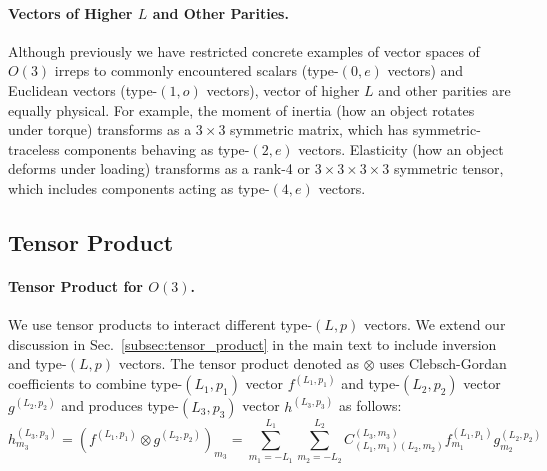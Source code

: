 \paragraph{Vectors of Higher $L$ and Other Parities.}
Although previously we have restricted concrete examples of vector spaces of $O(3)$ irreps to commonly encountered scalars (type-$(0, e)$ vectors) and Euclidean vectors (type-$(1, o)$ vectors), vector of higher $L$ and other parities are equally physical. 
For example, the moment of inertia (how an object rotates under torque) transforms as a $3\times3$ symmetric matrix, which has symmetric-traceless components behaving as type-$(2, e)$ vectors.
Elasticity (how an object deforms under loading) transforms as a rank-4 or $3\times3\times3\times3$ symmetric tensor, which includes components acting as type-$(4, e)$ vectors.


\subsection{Tensor Product}
\label{appendix:subsec:tensor_product}

\paragraph{Tensor Product for $O(3)$.}
We use tensor products to interact different type-$(L, p)$ vectors.
We extend our discussion in Sec.~\ref{subsec:tensor_product} in the main text to include inversion and type-$(L, p)$ vectors.
The tensor product denoted as $\otimes$ uses Clebsch-Gordan coefficients to combine type-$(L_1, p_1)$ vector $f^{(L_1, p_1)}$ and type-$(L_2, p_2)$ vector $g^{(L_2, p_2)}$ and produces type-$(L_3, p_3)$ vector $h^{(L_3, p_3)}$ as follows:
\begin{equation}
h^{(L_3, p_3)}_{m_3} = (f^{(L_1, p_1)} \otimes g^{(L_2, p_2)})_{m_3} = \sum_{m_1 = -L_1}^{L_1} \sum_{m_2 = -L_2}^{L_2} C^{(L_3, m_3)}_{(L_1, m_1)(L_2, m_2)} f^{(L_1, p_1)}_{m_1} g^{(L_2, p_2)}_{m_2} 
\label{appendix:eq:tensor_product}
\end{equation}

